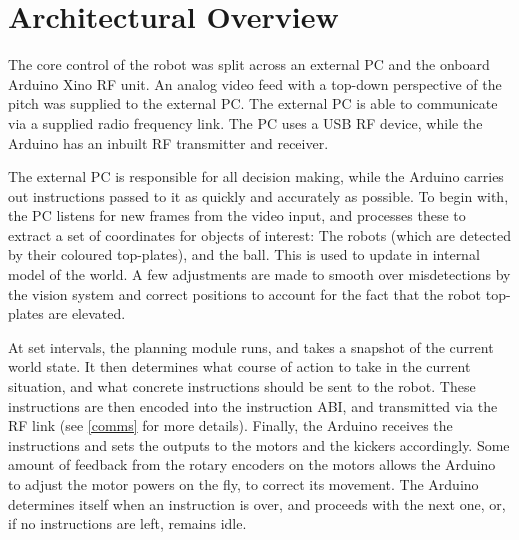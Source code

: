 \section{Architectural Overview}

The core control of the robot was split across an external PC and the onboard
Arduino Xino RF unit. An analog video feed with a top-down perspective of the
pitch was supplied to the external PC. The external PC is able to communicate
via a supplied radio frequency link. The PC uses a USB RF device, while the
Arduino has an inbuilt RF transmitter and receiver.

The external PC is responsible for all decision making, while the Arduino
carries out instructions passed to it as quickly and accurately as possible.
To begin with, the PC listens for new frames from the video input, and
processes these to extract a set of coordinates for objects of interest: The
robots (which are detected by their coloured top-plates), and the ball. This is
used to update in internal model of the world. A few adjustments are made to
smooth over misdetections by the vision system and correct positions to account
for the fact that the robot top-plates are elevated.

At set intervals, the planning module runs, and takes a snapshot of the current
world state. It then determines what course of action to take in the current
situation, and what concrete instructions should be sent to the robot. These
instructions are then encoded into the instruction ABI, and transmitted via the
RF link (see \cref{comms} for more details). Finally, the Arduino receives the
instructions and sets the outputs to the motors and the kickers accordingly.
Some amount of feedback from the rotary encoders on the motors allows the
Arduino to adjust the motor powers on the fly, to correct its movement. The
Arduino determines itself when an instruction is over, and proceeds with the
next one, or, if no instructions are left, remains idle.
